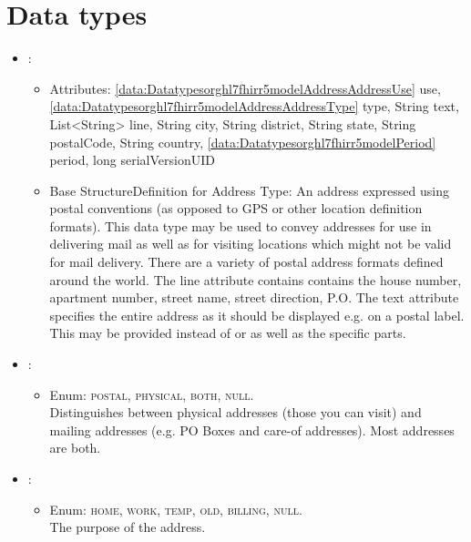 \section{Data types}\label{sec:datatypes}
\begin{itemize}[nolistsep,noitemsep]
\item {}: 
\begin{itemize}[noitemsep,nolistsep]
\item[] Attributes: \ref{data:Datatypesorghl7fhirr5modelAddressAddressUse} use, \ref{data:Datatypesorghl7fhirr5modelAddressAddressType} type, String text, List\textless{}String\textgreater{} line, String city, String district, String state, String postalCode, String country, \ref{data:Datatypesorghl7fhirr5modelPeriod} period, long serialVersionUID
\item[] Base StructureDefinition for Address Type: An address expressed using postal conventions (as opposed to GPS or other location definition formats).  This data type may be used to convey addresses for use in delivering mail as well as for visiting locations which might not be valid for mail delivery.  There are a variety of postal address formats defined around the world.
The line attribute contains contains the house number, apartment number, street name, street direction, P.O.
The text attribute specifies the entire address as it should be displayed e.g. on a postal label. This may be provided instead of or as well as the specific parts.
\end{itemize}

\item {}: 
\begin{itemize}[noitemsep,nolistsep]

\item[] Enum: \textsc{postal}, \textsc{physical}, \textsc{both}, \textsc{null}.\\Distinguishes between physical addresses (those you can visit) and mailing addresses (e.g. PO Boxes and care-of addresses). Most addresses are both.
\end{itemize}

\item {}: 
\begin{itemize}[noitemsep,nolistsep]

\item[] Enum: \textsc{home}, \textsc{work}, \textsc{temp}, \textsc{old}, \textsc{billing}, \textsc{null}.\\The purpose of the address.
\end{itemize}


\end{itemize}
